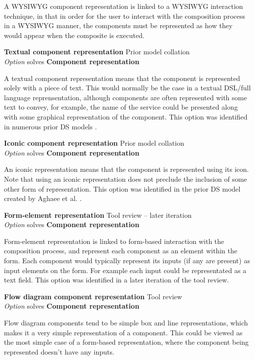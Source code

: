 A WYSIWYG component representation is linked to a WYSIWYG interaction technique, in that in order for the user to interact with the composition process in a WYSIWYG manner, the components must be represented as how they would appear when the composite is executed.

\textbf{Textual component representation} \hfill Prior model collation \cite{Aghaee2012,Fischer2009,Pietschmann2010} \\ \emph{Option} \hfill solves \textbf{Component representation}

A textual component representation means that the component is represented solely with a piece of text. This would normally be the case in a textual DSL/full language reprensentation, although components are often represented with some text to convey, for example, the name of the service could be presented along with some graphical representation of the component. This option was identified in numerous prior DS models \cite{Aghaee2012,Fischer2009,Pietschmann2010}.

\textbf{Iconic component representation} \hfill Prior model collation \cite{Aghaee2012} \\ \emph{Option} \hfill solves \textbf{Component representation}

An iconic representation means that the component is represented using its icon. Note that using an iconic representation does not preclude the inclusion of some other form of representation. This option was identified in the prior DS model created by Aghaee et al. \cite{Aghaee2012}.

\textbf{Form-element representation} \hfill Tool review  -- later iteration \\ \emph{Option} \hfill solves \textbf{Component representation}

Form-element representation is linked to form-based interaction with the composition process, and represent each component as an element within the form. Each component would typically represent its inputs (if any are present) as input elements on the form. For example each input could be representated as a text field. This option was identified in a later iteration of the tool review.

\textbf{Flow diagram component representation} \hfill Tool review \\ \emph{Option} \hfill solves \textbf{Component representation}

Flow diagram components tend to be simple box and line representations, which makes it a very simple representation of a component. This could be viewed as the most simple case of a form-based representation, where the component being represented doesn't have any inputs.

